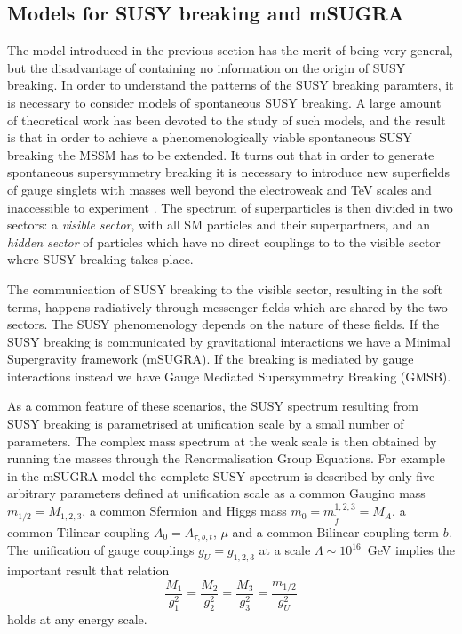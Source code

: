 \subsection{Models for SUSY breaking and mSUGRA}
The model introduced in the previous section has the merit of being very general, but the disadvantage of containing no information on the origin of SUSY breaking. In order to understand the patterns of the SUSY breaking paramters, it is necessary to consider models of spontaneous SUSY breaking. A large amount of theoretical work has been devoted to the study of such models, and the result is that in order to achieve a phenomenologically viable spontaneous SUSY breaking
the MSSM has to be extended. It turns out that in order to generate spontaneous supersymmetry breaking it is necessary to introduce new superfields of gauge singlets with masses well beyond the electroweak and TeV scales and inaccessible to experiment \cite{Martin}. The spectrum of superparticles is then divided in two  sectors: a \textit{visible sector}, with all SM particles and their superpartners, and an \textit{hidden sector} of particles which have no direct couplings to to the visible sector where SUSY breaking takes place.

The communication of SUSY breaking to the visible sector, resulting in the soft terms, happens radiatively through messenger fields which are shared by the two sectors. The SUSY phenomenology depends on the nature of these fields. If the SUSY breaking is communicated by gravitational interactions we have a Minimal Supergravity framework (mSUGRA). If the breaking is mediated by gauge interactions instead we have Gauge Mediated Supersymmetry Breaking (GMSB).

As a common feature of these scenarios, the SUSY spectrum resulting from SUSY breaking is parametrised at unification scale by a small number of parameters. The complex mass spectrum at the weak scale is then obtained by running the masses through the Renormalisation Group Equations. For example in the mSUGRA model the complete SUSY spectrum is described by only five arbitrary parameters defined at unification scale as a common Gaugino mass $m_{1/2}= M_{1,2,3}$, a common Sfermion and Higgs mass $m_{0}= m_{\tilde{f}}^{1,2,3} = M_{A}$, a common Tilinear coupling $A_{0}= A_{\tau,b,t}$, $\mu$ and a common Bilinear coupling term $b$. The unification of gauge couplings $g_U = g_{1,2,3}$ at a scale $\Lambda\sim10^{16}$~GeV implies the important result that relation\begin{equation}\label{eq:gaugeMass}
\dfrac{M_1}{g^2_1} = \dfrac{M_2}{g^2_2} = \dfrac{M_3}{g^2_3} = \dfrac{m_{1/2}}{g^2_U} 
\end{equation} holds at any energy scale.

